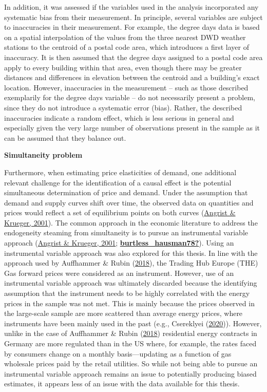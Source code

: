 \documentclass[12pt,twoside]{reedthesis}
\begin{document}
In addition, it was assessed if the variables used in the analysis incorporated any systematic bias from their measurement. In principle, several variables are subject to inaccuracies in their measurement. For example, the degree days data is based on a spatial interpolation of the values from the three nearest DWD weather stations to the centroid of a postal code area, which introduces a first layer of inaccuracy. It is then assumed that the degree days assigned to a postal code area apply to every building within that area, even though there may be greater distances and differences in elevation between the centroid and a building's exact location. However, inaccuracies in the measurement -- such as those described exemplarily for the degree days variable -- do not necessarily present a problem, since they do not introduce a systematic error (bias). Rather, the described inaccuracies indicate a random effect, which is less serious in general and especially given the very large number of observations present in the sample as it can be assumed that they balance out.

\textbf{Simultaneity problem}

Furthermore, when estimating price elasticities of demand, one additional relevant challenge for the identification of a causal effect is the potential simultaneous determination of price and demand. Under the assumption that demand and supply curves shift over time, the observed data on quantities and prices would reflect a set of equilibrium points on both curves (\protect\hyperlink{ref-angrist_krueger01}{Angrist \& Krueger, 2001}). The common approach in the economic literature to address the endogeneity steaming from simultaneity is to pursue an instrumental variable approach (\protect\hyperlink{ref-angrist_krueger01}{Angrist \& Krueger, 2001}; \protect\hyperlink{ref-burtless_hausman78}{\textbf{burtless\_hausman78?}}). Using an instrumental variable approach was also explored for this thesis. In line with the approach used by Auffhammer \& Rubin (\protect\hyperlink{ref-auffhammer_rubin18}{2018}), the Trading Hub Europe (THE) Gas forward prices were considered as an instrument. However, use of an instrumental variable approach was ultimately discarded because the identifying assumption that the instrument needs to be highly correlated with the energy prices in the sample was not met. This is mainly because the prices observed in the large-scale sample are more scattered than average energy prices, where instruments have been mainly used in the past (e.g., Csereklyei (\protect\hyperlink{ref-csereklyei20}{2020})). However, unlike in the case of Auffhammer \& Rubin (\protect\hyperlink{ref-auffhammer_rubin18}{2018}) residential energy contracts in Germany are more regulated than in the US where, for example, the rates faced by consumers change on a monthly basis---updating as a function of gas wholesale prices paid by the retail utilities. So while not being able to pursue an instrumental variable approach remains an issue to potentially producing biased estimates, it appears less of an issue with the data available for this thesis.
\end{document}
